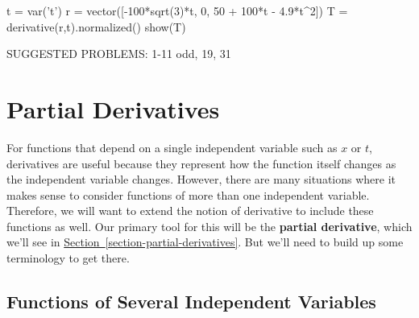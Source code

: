 \documentclass[10pt,]{book}
\newcommand{\terminology}[1]{\textbf{#1}}
\numberwithin{equation}{section}
\begin{document}
\begin{sageinput}
t = var('t')
r = vector([-100*sqrt(3)*t, 0, 50 + 100*t - 4.9*t^2])
T = derivative(r,t).normalized()
show(T)
\end{sageinput}
\hypertarget{p-1326}{}%
SUGGESTED PROBLEMS: 1-11 odd, 19, 31%
%
%
\typeout{************************************************}
\typeout{************************************************}
%
\chapter[{Partial Derivatives}]{Partial Derivatives}\label{partial-derivatives}
\begin{introduction}{}%
\hypertarget{p-1327}{}%
For functions that depend on a single independent variable such as \(x\) or \(t\), derivatives are useful because they represent how the function itself changes as the independent variable changes. However, there are many situations where it makes sense to consider functions of more than one independent variable. Therefore, we will want to extend the notion of derivative to include these functions as well. Our primary tool for this will be the \terminology{partial derivative}, which we'll see in \hyperref[section-partial-derivatives]{Section~\ref{section-partial-derivatives}}. But we'll need to build up some terminology to get there.%
\end{introduction}%
%
%
\typeout{************************************************}
\typeout{************************************************}
%
\section[{Functions of Several Independent Variables}]{Functions of Several Independent Variables}\label{section-functions-of-several-independent-variables}
%
%
\typeout{************************************************}
\typeout{************************************************}
%
\end{document}
